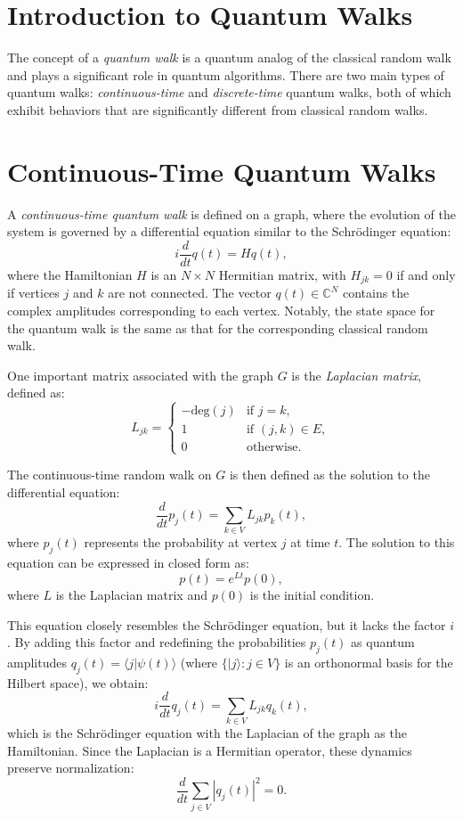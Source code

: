 \documentclass[11pt]{article}
\theoremstyle{definition}
\begin{document}
\section{Introduction to Quantum Walks}


The concept of a \textit{quantum walk} is a quantum analog of the classical random walk and plays a significant role in quantum algorithms. There are two main types of quantum walks: \textit{continuous-time} and \textit{discrete-time} quantum walks, both of which exhibit behaviors that are significantly different from classical random walks.

\section*{Continuous-Time Quantum Walks}
A \textit{continuous-time quantum walk} is defined on a graph, where the evolution of the system is governed by a differential equation similar to the Schrödinger equation:
\[
i\frac{d}{dt}q(t) = Hq(t),
\]
where the Hamiltonian \( H \) is an \( N \times N \) Hermitian matrix, with \( H_{jk} = 0 \) if and only if vertices \( j \) and \( k \) are not connected. The vector \( q(t) \in \mathbb{C}^N \) contains the complex amplitudes corresponding to each vertex. Notably, the state space for the quantum walk is the same as that for the corresponding classical random walk.

One important matrix associated with the graph \( G \) is the \textit{Laplacian matrix}, defined as:
\[
L_{jk} =
\begin{cases}
-\text{deg}(j) & \text{if } j = k, \\
1 & \text{if } (j, k) \in E, \\
0 & \text{otherwise}.
\end{cases}
\]

The continuous-time random walk on \( G \) is then defined as the solution to the differential equation:
\[
\frac{d}{dt} p_j(t) = \sum_{k \in V} L_{jk} p_k(t),
\]
where \( p_j(t) \) represents the probability at vertex \( j \) at time \( t \). The solution to this equation can be expressed in closed form as:
\[
p(t) = e^{Lt} p(0),
\]
where \( L \) is the Laplacian matrix and \( p(0) \) is the initial condition.

This equation closely resembles the Schrödinger equation, but it lacks the factor \( i \). By adding this factor and redefining the probabilities \( p_j(t) \) as quantum amplitudes \( q_j(t) = \langle j|\psi(t)\rangle \) (where \( \{ |j\rangle : j \in V \} \) is an orthonormal basis for the Hilbert space), we obtain:
\[
i \frac{d}{dt} q_j(t) = \sum_{k \in V} L_{jk} q_k(t),
\]
which is the Schrödinger equation with the Laplacian of the graph as the Hamiltonian. Since the Laplacian is a Hermitian operator, these dynamics preserve normalization:
\[
\frac{d}{dt} \sum_{j \in V} |q_j(t)|^2 = 0.
\]
\end{document}
